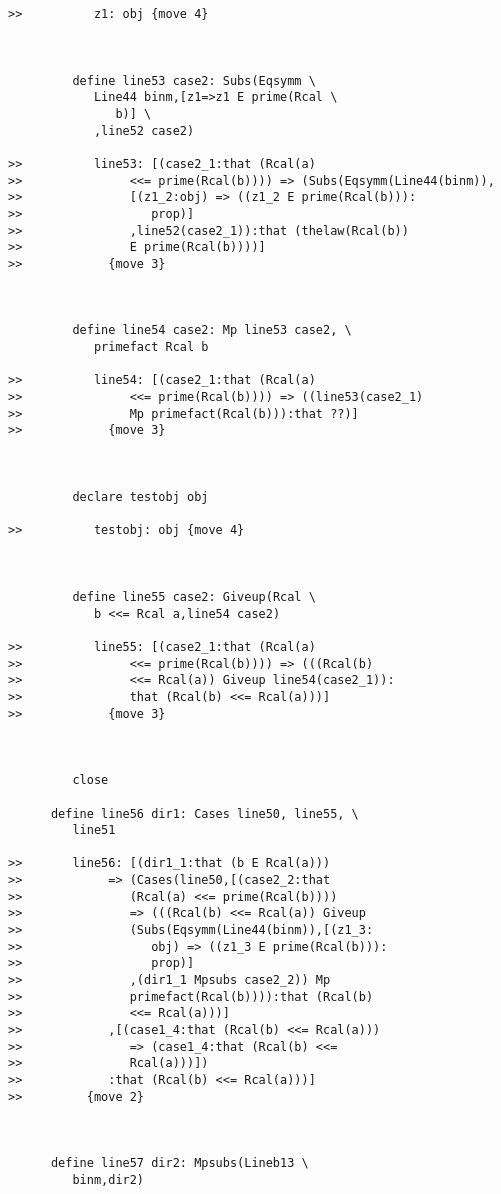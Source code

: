 \documentclass[12pt]{article}
\begin{document}
\begin{verbatim}
>>          z1: obj {move 4}



         define line53 case2: Subs(Eqsymm \
            Line44 binm,[z1=>z1 E prime(Rcal \
               b)] \
            ,line52 case2)

>>          line53: [(case2_1:that (Rcal(a)
>>               <<= prime(Rcal(b)))) => (Subs(Eqsymm(Line44(binm)),
>>               [(z1_2:obj) => ((z1_2 E prime(Rcal(b))):
>>                  prop)]
>>               ,line52(case2_1)):that (thelaw(Rcal(b))
>>               E prime(Rcal(b))))]
>>            {move 3}



         define line54 case2: Mp line53 case2, \
            primefact Rcal b

>>          line54: [(case2_1:that (Rcal(a)
>>               <<= prime(Rcal(b)))) => ((line53(case2_1)
>>               Mp primefact(Rcal(b))):that ??)]
>>            {move 3}



         declare testobj obj

>>          testobj: obj {move 4}



         define line55 case2: Giveup(Rcal \
            b <<= Rcal a,line54 case2)

>>          line55: [(case2_1:that (Rcal(a)
>>               <<= prime(Rcal(b)))) => (((Rcal(b)
>>               <<= Rcal(a)) Giveup line54(case2_1)):
>>               that (Rcal(b) <<= Rcal(a)))]
>>            {move 3}



         close

      define line56 dir1: Cases line50, line55, \
         line51

>>       line56: [(dir1_1:that (b E Rcal(a)))
>>            => (Cases(line50,[(case2_2:that
>>               (Rcal(a) <<= prime(Rcal(b))))
>>               => (((Rcal(b) <<= Rcal(a)) Giveup
>>               (Subs(Eqsymm(Line44(binm)),[(z1_3:
>>                  obj) => ((z1_3 E prime(Rcal(b))):
>>                  prop)]
>>               ,(dir1_1 Mpsubs case2_2)) Mp
>>               primefact(Rcal(b)))):that (Rcal(b)
>>               <<= Rcal(a)))]
>>            ,[(case1_4:that (Rcal(b) <<= Rcal(a)))
>>               => (case1_4:that (Rcal(b) <<=
>>               Rcal(a)))])
>>            :that (Rcal(b) <<= Rcal(a)))]
>>         {move 2}



      define line57 dir2: Mpsubs(Lineb13 \
         binm,dir2)


\end{verbatim}
\end{document}
